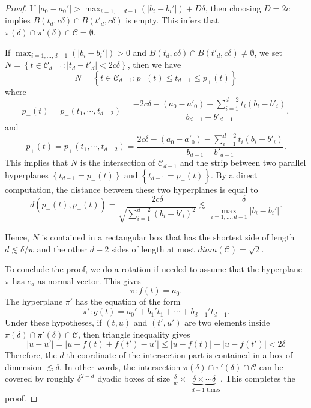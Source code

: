 \documentclass[11pt]{article}
\newcommand{\1}{\mathbf{1}}
\begin{document}
\begin{proof}
    If   $|a_0-a_0'| > \max_{i=1, \ldots, d-1}\left(|b_i-b_i'|\right)+D\delta$, then choosing  $D=2c $ implies $ B(t_d,c\delta) \cap B(t'_d,c\delta)$ is empty. This infers that
    $\pi(\delta) \cap \pi'(\delta) \cap \mathcal{C}=\emptyset$.

    If $\max_{i=1, \ldots, d-1}(|b_i-b_i'|)>0$ and $B(t_d,c\delta) \cap B(t'_d,c\delta)\ne \emptyset$, we set $N = \left\lbrace t \in \mathcal{C}_{d-1}: |t_d-t'_d| <2c\delta\right\rbrace$, then we have
    \[N = \left\lbrace t \in  \mathcal{C}_{d-1}: p_-(t) \le t_{d-1} \le p_+(t)\right\rbrace\]
    where
    \[p_-(t) = p_-(t_1,\cdots,t_{d-2}) = \dfrac{-2c\delta -(a_0-a'_0)-\sum_{i=1}^{d-2}t_i(b_i-b'_i)}{b_{d-1}-b'_{d-1}},\]
    and
    \[p_+(t) = p_+(t_1,\cdots,t_{d-2}) = \dfrac{2c\delta -(a_0-a'_0)-\sum_{i=1}^{d-2}t_i(b_i-b'_i)}{b_{d-1}-b'_{d-1}}.\]
    This implies that $N$ is the intersection of $\mathcal{C}_{d-1}$ and the strip between two parallel hyperplanes $\left\lbrace t_{d-1}=p_-(t)\right\rbrace $ and $\left\lbrace t_{d-1}=p_+(t)\right\rbrace $. By a direct computation, the distance between these two hyperplanes is equal to \[d(p_-(t),p_+(t))=\dfrac{2c\delta}{\sqrt{\sum_{i=1}^{d-2} (b_i-b'_i)^2}} \lesssim \dfrac{\delta}{\max_{i=1, \ldots, d-1}|b_i-b_i'|}.\]

    Hence, $N$ is contained in a rectangular box that has the shortest side of length $d\lesssim \delta/w$ and the other $d-2$ sides of length at most $diam(\mathcal{C})=\sqrt{2}$.


    To conclude the proof, we do a rotation if needed to assume that the hyperplane $\pi$ has $e_d$ as normal vector. This gives
    \[\pi: f(t) = a_0.\]
    The hyperplane $\pi'$ has the equation of the form
    \[\pi': g(t) = a_0'+b_1't_1+\cdots +b_{d-1}'t_{d-1}.\]
    Under these hypotheses, if $(t,u)$ and $(t',u')$ are two elements inside $\pi(\delta)\cap \pi'(\delta)\cap \mathcal{C}$, then triangle inequality gives
    \[|u-u'| = |u-f(t)+f(t')-u'| \le |u-f(t)|+|u-f(t')| <2\delta\]
    Therefore, the $d$-th coordinate of the intersection part is contained in a box of dimension $\lesssim \delta$. In other words, the intersection $\pi(\delta)\cap \pi'(\delta)\cap \mathcal{C}$ can be covered by roughly $\delta^{2-d}$ dyadic boxes of size $\frac{\delta}{w}\times\underbrace{\delta\times\cdots \delta}_\textrm{ $d-1$ times}$. This completes the proof.
\end{proof}
\end{document}
